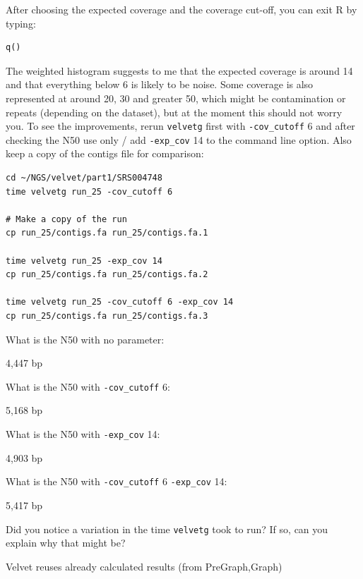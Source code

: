 \begin{steps}
After choosing the expected coverage and the coverage cut-off, you can exit R by
typing:
\begin{lstlisting}[style=R]
q()
\end{lstlisting}
\end{steps}

\begin{steps}
The weighted histogram suggests to me that the expected coverage is around 14
and that everything below 6 is likely to be noise. Some coverage is also
represented at around 20, 30 and greater 50, which might be contamination or
repeats (depending on the dataset), but at the moment this should not worry you.
To see the improvements, rerun \texttt{velvetg} first with \texttt{-cov\_cutoff} 6 and
after checking the N50 use only / add \texttt{-exp\_cov} 14 to the command line
option. Also keep a copy of the contigs file for comparison:
\begin{lstlisting}
cd ~/NGS/velvet/part1/SRS004748
time velvetg run_25 -cov_cutoff 6

# Make a copy of the run
cp run_25/contigs.fa run_25/contigs.fa.1

time velvetg run_25 -exp_cov 14
cp run_25/contigs.fa run_25/contigs.fa.2

time velvetg run_25 -cov_cutoff 6 -exp_cov 14
cp run_25/contigs.fa run_25/contigs.fa.3
\end{lstlisting}
\end{steps}

\begin{questions}
What is the N50 with no parameter:
\begin{answer}
4,447 bp
\end{answer}

What is the N50 with \texttt{-cov\_cutoff} 6:
\begin{answer}
5,168 bp
\end{answer}

What is the N50 with \texttt{-exp\_cov} 14:
\begin{answer}
4,903 bp
\end{answer}

What is the N50 with \texttt{-cov\_cutoff} 6 \texttt{-exp\_cov} 14:
\begin{answer}
5,417 bp
\end{answer}

Did you notice a variation in the time \texttt{velvetg} took to run? If so, can you
explain why that might be?
\begin{answer}
Velvet reuses already calculated results (from PreGraph,Graph)
\end{answer}

\end{questions}

